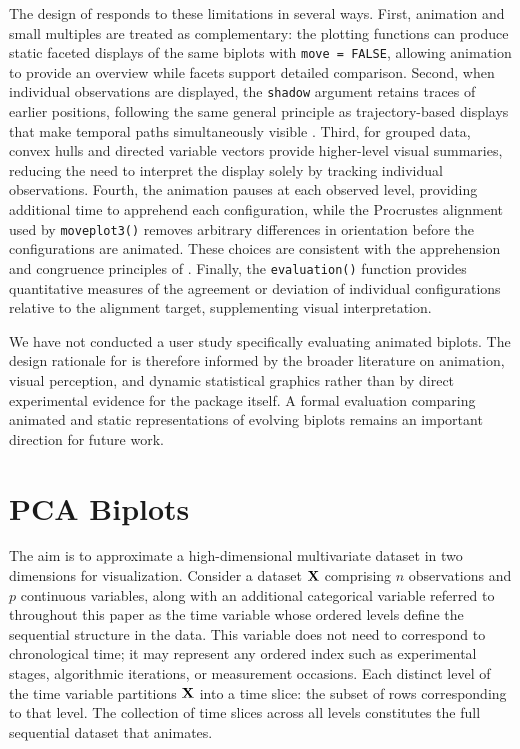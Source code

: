 The design of  responds to these limitations in several ways. First, animation and small multiples are treated as complementary: the plotting functions can produce static faceted displays of the same biplots with \texttt{move\ =\ FALSE}, allowing animation to provide an overview while facets support detailed comparison. Second, when individual observations are displayed, the \texttt{shadow} argument retains traces of earlier positions, following the same general principle as trajectory-based displays that make temporal paths simultaneously visible \citep{Robertson2008}. Third, for grouped data, convex hulls and directed variable vectors provide higher-level visual summaries, reducing the need to interpret the display solely by tracking individual observations. Fourth, the animation pauses at each observed level, providing additional time to apprehend each configuration, while the Procrustes alignment used by \texttt{moveplot3()} removes arbitrary differences in orientation before the configurations are animated. These choices are consistent with the apprehension and congruence principles of \citet{Tversky2002}. Finally, the \texttt{evaluation()} function provides quantitative measures of the agreement or deviation of individual configurations relative to the alignment target, supplementing visual interpretation.

We have not conducted a user study specifically evaluating animated biplots. The design rationale for  is therefore informed by the broader literature on animation, visual perception, and dynamic statistical graphics rather than by direct experimental evidence for the package itself. A formal evaluation comparing animated and static representations of evolving biplots remains an important direction for future work.

\section{PCA Biplots}\label{pca-biplots}

The aim is to approximate a high-dimensional multivariate dataset in two dimensions for visualization. Consider a dataset \({\bf{X}}\) comprising \(n\) observations and \(p\) continuous variables, along with an additional categorical variable referred to throughout this paper as the time variable whose ordered levels define the sequential structure in the data. This variable does not need to correspond to chronological time; it may represent any ordered index such as experimental stages, algorithmic iterations, or measurement occasions. Each distinct level of the time variable partitions \({\bf{X}}\) into a time slice: the subset of rows corresponding to that level. The collection of time slices across all levels constitutes the full sequential dataset that  animates.

